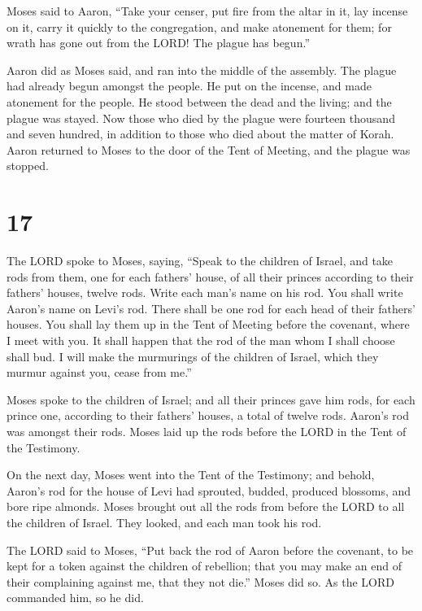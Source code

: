  Moses said to Aaron, ``Take your censer, put fire from
the altar in it, lay incense on it, carry it quickly to the
congregation, and make atonement for them; for wrath has gone out from
the LORD! The plague has begun.''

 Aaron did as Moses said, and ran into the middle of the
assembly. The plague had already begun amongst the people. He put on the
incense, and made atonement for the people.  He stood
between the dead and the living; and the plague was stayed.
 Now those who died by the plague were fourteen thousand
and seven hundred, in addition to those who died about the matter of
Korah.  Aaron returned to Moses to the door of the Tent
of Meeting, and the plague was stopped.

\hypertarget{section-16}{%
\section{17}\label{section-16}}

 The LORD spoke to Moses, saying,  ``Speak
to the children of Israel, and take rods from them, one for each
fathers' house, of all their princes according to their fathers' houses,
twelve rods. Write each man's name on his rod.  You shall
write Aaron's name on Levi's rod. There shall be one rod for each head
of their fathers' houses.  You shall lay them up in the
Tent of Meeting before the covenant, where I meet with you.
 It shall happen that the rod of the man whom I shall
choose shall bud. I will make the murmurings of the children of Israel,
which they murmur against you, cease from me.''

 Moses spoke to the children of Israel; and all their
princes gave him rods, for each prince one, according to their fathers'
houses, a total of twelve rods. Aaron's rod was amongst their rods.
 Moses laid up the rods before the LORD in the Tent of the
Testimony.

 On the next day, Moses went into the Tent of the
Testimony; and behold, Aaron's rod for the house of Levi had sprouted,
budded, produced blossoms, and bore ripe almonds.  Moses
brought out all the rods from before the LORD to all the children of
Israel. They looked, and each man took his rod.

 The LORD said to Moses, ``Put back the rod of Aaron
before the covenant, to be kept for a token against the children of
rebellion; that you may make an end of their complaining against me,
that they not die.''  Moses did so. As the LORD commanded
him, so he did.

